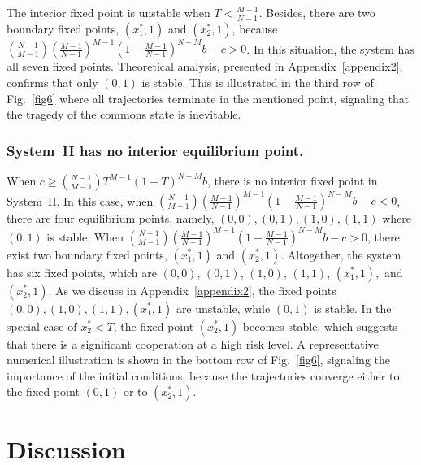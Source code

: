 \documentclass[9pt]{elife}
\begin{document}
The interior fixed point is unstable when $T<\frac{M-1}{N-1}$. Besides, there are two boundary fixed points, $(x_{1}^{*}, 1)$ and $(x_{2}^{*}, 1)$, because $\binom{N-1}{M-1}(\frac{M-1}{N-1})^{M-1}(1-\frac{M-1}{N-1})^{N-M}b-c>0$. In this situation, the system has all seven fixed points. Theoretical analysis, presented in Appendix~\ref{appendix2}, confirms that only $(0, 1)$ is stable. This is illustrated in the third row of Fig.~\ref{fig6} where all trajectories terminate in the mentioned point, signaling that the tragedy of the commons state is inevitable.

\subsubsection{System~II has no interior equilibrium point.}

When $c\geq\binom{N-1}{M-1}T^{M-1}(1-T)^{N-M}b$, there is no interior fixed point in System~II. In this case, when $\binom{N-1}{M-1}(\frac{M-1}{N-1})^{M-1}(1-\frac{M-1}{N-1})^{N-M}b-c<0$, there are four equilibrium points, namely, $(0, 0), (0, 1), (1 ,0), (1, 1)$ where $(0, 1)$ is stable. When $\binom{N-1}{M-1}(\frac{M-1}{N-1})^{M-1}(1-\frac{M-1}{N-1})^{N-M}b-c>0$, there exist two boundary fixed points, $(x_{1}^{*}, 1)$ and $(x_{2}^{*}, 1)$. Altogether, the system has six fixed points, which are $(0, 0)$, $(0, 1)$, $(1 ,0)$, $(1, 1)$, $(x_{1}^{*},1),$ and $(x_{2}^{*},1)$. As we discuss in Appendix~\ref{appendix2}, the fixed points $(0, 0), (1 ,0), (1, 1), (x_{1}^{*},1)$ are unstable, while $(0, 1)$ is stable. In the special case of $x_{2}^{*}<T$, the fixed point $(x_{2}^{*},1)$ becomes stable, which suggests that there is a significant cooperation at a high risk level. A representative numerical illustration is shown in the bottom row of Fig.~\ref{fig6}, signaling the importance of the initial conditions, because the trajectories converge either to the fixed point $(0, 1)$ or to $(x_{2}^{*},1)$.

\section{Discussion}
\end{document}
